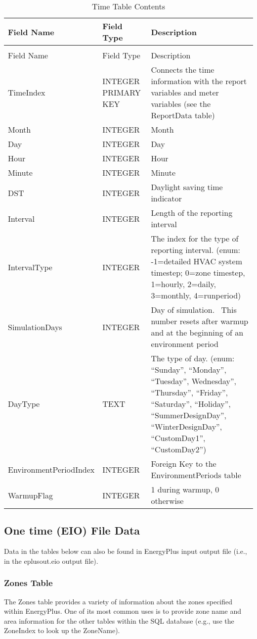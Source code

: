\begin{longtable}[c]{p{1.5in}p{1.5in}p{3.0in}}
\caption{Time Table Contents \label{table:table-10.-time-table-contents}} \tabularnewline
\toprule 
Field Name & Field Type & Description \tabularnewline
\midrule
\endfirsthead

\caption[]{Time Table Contents} \tabularnewline
\toprule 
Field Name & Field Type & Description \tabularnewline
\midrule
\endhead

TimeIndex & INTEGER PRIMARY KEY & Connects the time information with the report variables and meter variables (see the ReportData table) \tabularnewline
Month & INTEGER & Month \tabularnewline
Day & INTEGER & Day \tabularnewline
Hour & INTEGER & Hour \tabularnewline
Minute & INTEGER & Minute \tabularnewline
DST & INTEGER & Daylight saving time indicator \tabularnewline
Interval & INTEGER & Length of the reporting interval \tabularnewline
IntervalType & INTEGER & The index for the type of reporting interval. (enum: -1=detailed HVAC system timestep; 0=zone timestep, 1=hourly, 2=daily, 3=monthly, 4=runperiod) \tabularnewline
SimulationDays & INTEGER & Day of simulation.~ This number resets after warmup and at the beginning of an environment period \tabularnewline
DayType & TEXT & The type of day. (enum: “Sunday”, “Monday”, “Tuesday”, Wednesday”, “Thursday”, “Friday”, “Saturday”, “Holiday”, “SummerDesignDay”, “WinterDesignDay”, “CustomDay1”, “CustomDay2”) \tabularnewline
EnvironmentPeriodIndex & INTEGER & Foreign Key to the EnvironmentPeriods table \tabularnewline
WarmupFlag & INTEGER & 1 during warmup, 0 otherwise \tabularnewline
\bottomrule
\end{longtable}

\subsection{One time (EIO) File Data}

Data in the tables below can also be found in EnergyPlus input output file (i.e., in the eplusout.eio output file).

\subsubsection{Zones Table}

The Zones table provides a variety of information about the zones specified within EnergyPlus. One of its most common uses is to provide zone name and area information for the other tables within the SQL database (e.g., use the ZoneIndex to look up the ZoneName).

